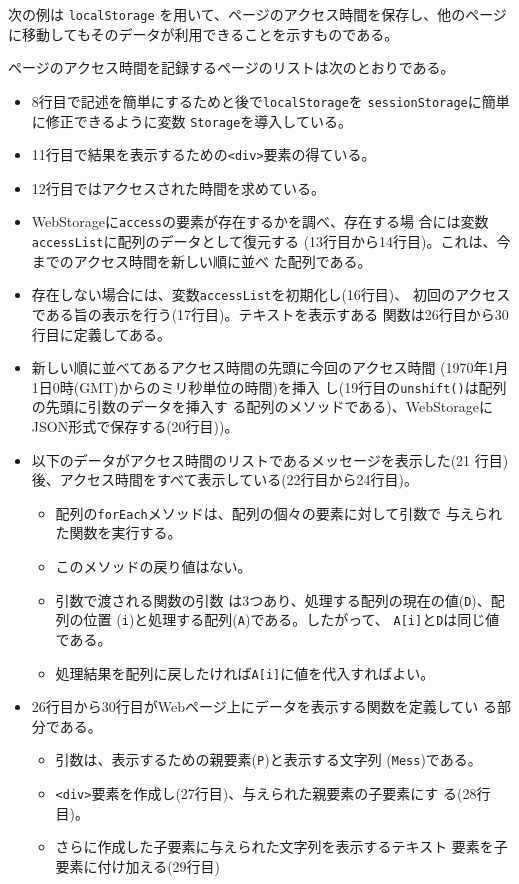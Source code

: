 \begin{Exec}\upshape
次の例は \texttt{localStorage} を用いて、ページのアクセス時間を保存し、他のページ
 に移動してもそのデータが利用できることを示すものである。

ページのアクセス時間を記録するページのリストは次のとおりである。
 \begin{itemize}
	\item 8行目で記述を簡単にするためと後で\texttt{localStorage}を
				\texttt{sessionStorage}に簡単に修正できるように変数
				\texttt{Storage}を導入している。
	\item 11行目で結果を表示するための\texttt{<div>}要素の得ている。
	\item 12行目ではアクセスされた時間を求めている。
	\item WebStorageに\texttt{access}の要素が存在するかを調べ、存在する場
				合には変数\texttt{accessList}に配列のデータとして復元する
				(13行目から14行目)。これは、今までのアクセス時間を新しい順に並べ
				た配列である。
	\item 存在しない場合には、変数\texttt{accessList}を初期化し(16行目)、
				初回のアクセスである旨の表示を行う(17行目)。テキストを表示すある
				関数は26行目から30行目に定義してある。
	\item 新しい順に並べてあるアクセス時間の先頭に今回のアクセス時間
				(1970年1月1日0時(GMT)からのミリ秒単位の時間)を挿入
				し(19行目の\texttt{unshift()}は配列の先頭に引数のデータを挿入す
				る配列のメソッドである)、WebStorageにJSON形式で保存する(20行目))。
	\item 以下のデータがアクセス時間のリストであるメッセージを表示した(21
				行目)後、アクセス時間をすべて表示している(22行目から24行目)。
\begin{itemize}
 \item 配列の\texttt{forEach}メソッドは、配列の個々の要素に対して引数で
				与えられた関数を実行する。
 \item このメソッドの戻り値はない。
 \item 引数で渡される関数の引数
				は3つあり、処理する配列の現在の値(\texttt{D})、配列の位置
			 (\texttt{i})と処理する配列(\texttt{A})である。したがって、
			 \texttt{A[i]}と\texttt{D}は同じ値である。
 \item 処理結果を配列に戻したければ\texttt{A[i]}に値を代入すればよい。
\end{itemize}
	\item 26行目から30行目がWebページ上にデータを表示する関数を定義してい
				る部分である。
				\begin{itemize}
				 \item 引数は、表示するための親要素(\texttt{P})と表示する文字列
							 (\texttt{Mess})である。
				 \item \texttt{<div>}要素を作成し(27行目)、与えられた親要素の子要素にす
							 る(28行目)。
				 \item さらに作成した子要素に与えられた文字列を表示するテキスト
							 要素を子要素に付け加える(29行目)
				\end{itemize}
				

\end{itemize}
\end{Exec}
